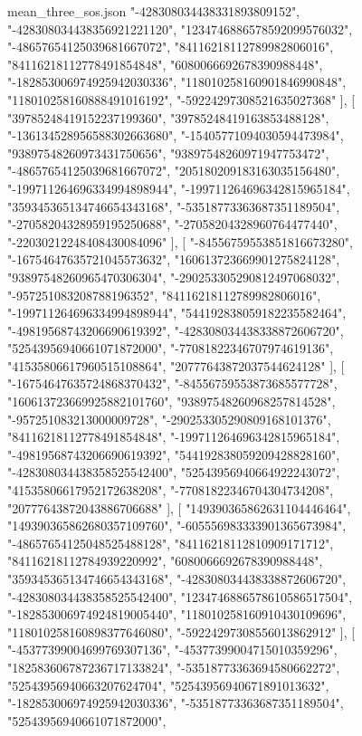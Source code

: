 \begin{filecontents*}[overwrite]{mean_three_sos.json}
    "-428308034438331893809152",
    "-428308034438356921221120",
    "1234746886578592099576032",
    "-48657654125039681667072",
    "84116218112789982806016",
    "84116218112778491854848",
    "6080066692678390988448",
    "-182853006974925942030336",
    "118010258160901846990848",
    "118010258160888491016192",
    "-59224297308521635027368"
   ],
   [
    "39785248419152237199360",
    "39785248419163853488128",
    "-136134528956588302663680",
    "-15405771094030594473984",
    "93897548260973431750656",
    "93897548260971947753472",
    "-48657654125039681667072",
    "205180209183163035156480",
    "-199711264696334994898944",
    "-199711264696342815965184",
    "359345365134746654343168",
    "-53518773363687351189504",
    "-27058204328959195250688",
    "-27058204328960764477440",
    "-22030212248408430084096"
   ],
   [
    "-84556759553851816673280",
    "-16754647635721045573632",
    "160613723669901275824128",
    "93897548260965470306304",
    "-290253305290812497068032",
    "-957251083208788196352",
    "84116218112789982806016",
    "-199711264696334994898944",
    "544192838059182235582464",
    "-49819568743206690619392",
    "-428308034438338872606720",
    "52543956940661071872000",
    "-77081822346707974619136",
    "41535806617960515108864",
    "20777643872037544624128"
   ],
   [
    "-16754647635724868370432",
    "-84556759553873685577728",
    "160613723669925882101760",
    "93897548260968257814528",
    "-957251083213000009728",
    "-290253305290809168101376",
    "84116218112778491854848",
    "-199711264696342815965184",
    "-49819568743206690619392",
    "544192838059209428828160",
    "-428308034438358525542400",
    "52543956940664922243072",
    "41535806617952172638208",
    "-77081822346704304734208",
    "20777643872043886706688"
   ],
   [
    "149390365862631104446464",
    "149390365862680357109760",
    "-605556983333901365673984",
    "-48657654125048525488128",
    "84116218112810909171712",
    "84116218112784939220992",
    "6080066692678390988448",
    "359345365134746654343168",
    "-428308034438338872606720",
    "-428308034438358525542400",
    "1234746886578610586517504",
    "-182853006974924819005440",
    "118010258160910430109696",
    "118010258160898377646080",
    "-59224297308556013862912"
   ],
   [
    "-45377399004699769307136",
    "-45377399004715010359296",
    "182583606787236717133824",
    "-53518773363694580662272",
    "52543956940663207624704",
    "52543956940671891013632",
    "-182853006974925942030336",
    "-53518773363687351189504",
    "52543956940661071872000",

\end{filecontents*}
